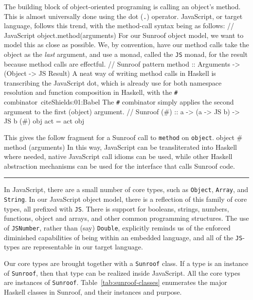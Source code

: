 \documentclass{llncs}
\newcommand{\Src}[1]{{\tt{#1}}}
\newenvironment{Code}{\verbatim}{\endverbatim}
\newcommand{\CURSOR}{\noindent\rule{\textwidth}{4pt}}
\begin{document}
The building block of object-oriented programing is calling an object's method.
This is almost universally done using the dot (\Src{.}) operator. JavaScript, or target language, 
follows this trend, with the method-call syntax being as follows:
\begin{Code}
  // JavaScript
  object.method(arguments)
\end{Code}
For our Sunroof object model, we want to model this as close as possible.
We, by convention, have our method calls take the object as the {\em last\/} argument,
and use a monad, called the \Src{JS} monad, for the result because method calls are effectful.
\begin{Code}
// Sunroof pattern
method :: Arguments -> (Object -> JS Result)
\end{Code}
A neat way of writing method calls in Haskell is transcribing the JavaScript dot, which is already use
for both namespace resolution and function composition in Haskell, with the \Src{\#} combinator~cite{Shields:01:Babel}
The \Src{\#} combinator simply applies the second argument to the first (object) argument.
\begin{Code}
// Sunroof        
(#) :: a -> (a -> JS b) -> JS b
(#) obj act = act obj
\end{Code}

\noindent
This gives the follow fragment for a Sunroof call to \Src{method} on \Src{object}.
\begin{Code}
  object # method (arguments)
\end{Code}
In this way, JavaScript can be transliterated into Haskell where needed,
native JavaScript call idioms can be used,
while other Haskell abstraction mechanisms can be used for the interface that calls Sunroof code.

\CURSOR{}

In JavaScript, there are a small number of core types, such as \Src{Object}, \Src{Array}, and \Src{String}.
In our JavaScript object model, there is a reflection of this family of core types, all prefixed with \Src{JS}.
There is support for booleans, strings, numbers, functions,
object and arrays, and other common programming structures.
The use of \Src{JSNumber}, rather than (say) \Src{Double},
explicitly reminds us of the enforced diminished capabilities of
being within an embedded language, 
and all of the \Src{JS}-types are representable in our target language.

Our core types are brought together with a \Src{Sunroof} class.
If a type is an instance of \Src{Sunroof}, then that type can be realized inside JavaScript.
All the core types are instances of \Src{Sunroof}. Table~\ref{tab:sunroof-classes}
enumerates the major Haskell classes in Sunroof, and their instances and purpose.
\end{document}
